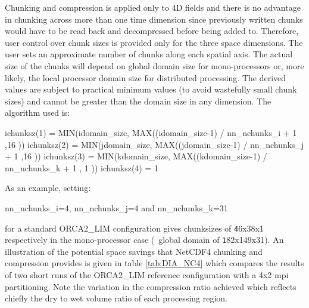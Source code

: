 \documentclass[../main/NEMO_manual]{subfiles}
\begin{document}
Chunking and compression is applied only to 4D fields and
there is no advantage in chunking across more than one time dimension since
previously written chunks would have to be read back and decompressed before being added to.
Therefore, user control over chunk sizes is provided only for the three space dimensions.
The user sets an approximate number of chunks along each spatial axis.
The actual size of the chunks will depend on global domain size for mono-processors or, more likely,
the local processor domain size for distributed processing.
The derived values are subject to practical minimum values (to avoid wastefully small chunk sizes) and
cannot be greater than the domain size in any dimension.
The algorithm used is:

\begin{forlines}
ichunksz(1) = MIN(idomain_size, MAX((idomain_size-1) / nn_nchunks_i + 1 ,16 ))
ichunksz(2) = MIN(jdomain_size, MAX((jdomain_size-1) / nn_nchunks_j + 1 ,16 ))
ichunksz(3) = MIN(kdomain_size, MAX((kdomain_size-1) / nn_nchunks_k + 1 , 1 ))
ichunksz(4) = 1
\end{forlines}

\noindent As an example, setting:

\begin{forlines}
nn_nchunks_i=4, nn_nchunks_j=4 and nn_nchunks_k=31
\end{forlines}

\noindent for a standard ORCA2\_LIM configuration gives chunksizes of {\small\texttt 46x38x1} respectively in
the mono-processor case (\ie\ global domain of {\small\texttt 182x149x31}).
An illustration of the potential space savings that NetCDF4 chunking and compression provides is given in
table \autoref{tab:DIA_NC4} which compares the results of two short runs of the ORCA2\_LIM reference configuration with
a 4x2 mpi partitioning.
Note the variation in the compression ratio achieved which reflects chiefly the dry to wet volume ratio of
each processing region.
\end{document}
